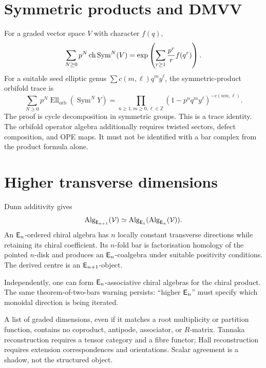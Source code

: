 \section{Symmetric products and DMVV}
For a graded vector space \(V\) with character \(f(q)\),
\[
 \sum_{N\ge0}p^N\operatorname{ch}\operatorname{Sym}^N(V)
 =\exp\left(\sum_{r\ge1}\frac{p^r}{r}f(q^r)\right).
\]
For a suitable seed elliptic genus \(\sum c(m,\ell)q^my^\ell\), the symmetric-product orbifold trace is
\[
 \sum_{N\ge0}p^N\operatorname{Ell}_{\mathrm{orb}}(\operatorname{Sym}^NY)
 =\prod_{n\ge1,m\ge0,\ell\in\mathbb Z}
 (1-p^nq^my^\ell)^{-c(nm,\ell)}.
\]
The proof is cycle decomposition in symmetric groups.  This is a trace identity.  The orbifold operator algebra additionally requires twisted sectors, defect composition, and OPE maps.  It must not be identified with a bar complex from the product formula alone.

\section{Higher transverse dimensions}
Dunn additivity gives
\[
 \operatorname{Alg}_{\mathsf E_{n+1}}(\mathcal V)
 \simeq\operatorname{Alg}_{\mathsf E_1}(\operatorname{Alg}_{\mathsf E_n}(\mathcal V)).
\]
An \(\mathsf E_n\)-ordered chiral algebra has \(n\) locally constant transverse directions while retaining its chiral coefficient.  Its \(n\)-fold bar is factorisation homology of the pointed \(n\)-disk and produces an \(\mathsf E_n\)-coalgebra under suitable positivity conditions.  The derived centre is an \(\mathsf E_{n+1}\)-object.

Independently, one can form \(\mathsf E_n\)-associative chiral algebras for the chiral product.  The same theorem-of-two-bars warning persists: ``higher \(\mathsf E_n\)'' must specify which monoidal direction is being iterated.

\begin{nogobox}[title={No-go theorem 18: dimension loss does not reconstruct a quantum group}]
A list of graded dimensions, even if it matches a root multiplicity or partition function, contains no coproduct, antipode, associator, or \(R\)-matrix.  Tannaka reconstruction requires a tensor category and a fibre functor; Hall reconstruction requires extension correspondences and orientations.  Scalar agreement is a shadow, not the structured object.
\end{nogobox}
